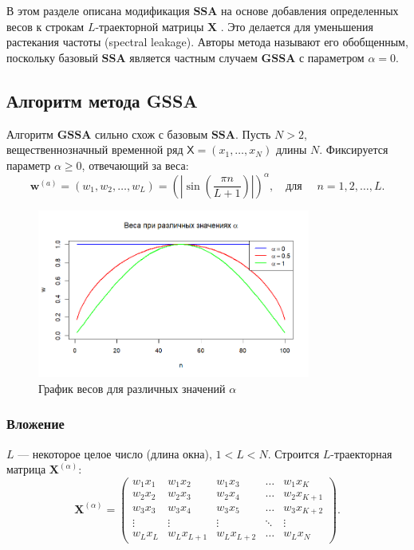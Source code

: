 \documentclass[a4paper, 11pt]{article}
\newcommand{\SSA}{\textbf{SSA}}
\newcommand{\GSSA}{\textbf{GSSA}}
\newcommand{\TS}{\mathsf{X}}
\begin{document}
В этом разделе описана модификация $\SSA$ на основе добавления определенных весов к строкам $L$-траекторной матрицы $\mathbf{X}$ \cite{gu2024generalized}. Это делается для уменьшения растекания частоты (spectral leakage). Авторы метода называют его обобщенным, поскольку базовый $\SSA$ является частным случаем $\GSSA$ с параметром $\alpha = 0$.

\subsection{Алгоритм метода GSSA}
Алгоритм $\GSSA$ сильно схож с базовым $\SSA$. Пусть $N > 2$, вещественнозначный временной ряд
$\TS = (x_1, \dots, x_{N})$ длины $N$. Фиксируется параметр $\alpha \geq 0$, отвечающий за веса:
\begin{equation*}
	{\boldsymbol{w}}^{(a)} = (w_{1}, w_{2}, \ldots, w_{L}) = \left( \left| \sin\left(\frac{\pi n}{L+1}\right) \right| \right)^\alpha, \quad \text{для } \quad n = 1, 2, \dots, L.
\end{equation*}

\begin{figure}[h]
    \centering
    \includegraphics[width=0.8\textwidth]{img/weights.png} %
    \caption{График весов для различных значений \(\alpha\)} %
    \label{fig:weights} %
\end{figure}


\subsubsection{Вложение}
$L$ --- некоторое целое число (длина окна), $1 < L < N$. Строится $L$-траекторная матрица $\mathbf{X}^{(\alpha)}$:
\begin{equation}
	\label{eq:X_alpha}
	\mathbf{X}^{(\alpha)} = 
	\begin{pmatrix}
		w_1 x_1 & w_1 x_2 & w_1 x_3 & \dots & w_1 x_{K} \\
		w_2 x_2 & w_2 x_3 & w_2 x_4 & \dots & w_2 x_{K+1} \\
		w_3 x_3 & w_3 x_4 & w_3 x_5 & \dots & w_3 x_{K+2} \\
		\vdots & \vdots & \vdots & \ddots & \vdots \\
		w_L x_{L} & w_L x_{L+1} & w_L x_{L+2} & \dots & w_L x_{N}
	\end{pmatrix}.
\end{equation}
\end{document}
